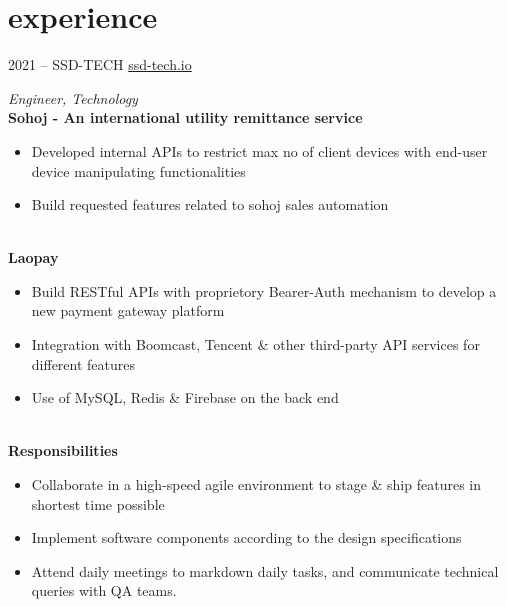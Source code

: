 \section{experience}
\begin{entrylist}

	\entry
	{2021 -- }
	{SSD-TECH}
	{\href{https://ssd-tech.io}{ssd-tech.io}}
	{\emph{Engineer, Technology} \newline
		\ \\
		\textbf{Sohoj - An international utility remittance service}
		\begin{itemize}
			\item Developed internal APIs to restrict max no of client devices with end-user device manipulating functionalities
			\item Build requested features related to sohoj sales automation
		\end{itemize}
		\ \\
		\textbf{Laopay}
		\begin{itemize}
			\item Build RESTful APIs with proprietory Bearer-Auth mechanism to develop a new payment gateway platform
			\item Integration with Boomcast, Tencent \& other third-party API services for different features
			\item Use of MySQL, Redis \& Firebase on the back end
		\end{itemize}
		\ \\
		\textbf{Responsibilities}
		\begin{itemize}
			\item Collaborate in a high-speed agile environment to stage \& ship features in shortest time possible
			\item Implement software components according to the design specifications
			\item Attend daily meetings to markdown daily tasks, and communicate technical queries with QA teams.
		\end{itemize}
	}

\end{entrylist}